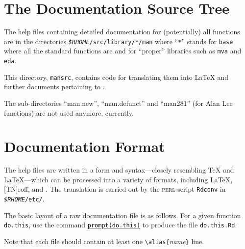 \newcommand*{\BS}{\textbackslash}
\newcommand*{\RHOMEdir}[1]{\texttt{\emph{\$RHOME}/#1}}
\newcommand*{\QQUAD}{\hspace*{1em}}

\section{The Documentation Source Tree}

The help files containing detailed documentation for (potentially) all
\R{} functions are in the directories \RHOMEdir{src/library/*/man} where
``\texttt{*}'' stands for \texttt{base} where all the standard functions
are and for ``proper'' libraries such as \texttt{mva} and \texttt{eda}.

This directory, \texttt{mansrc}, contains code for translating them into
\LaTeX{} and further documents pertaining to \R.

The sub-directories ``man.new'', ``man.defunct'' and ``man281'' (for
Alan Lee functions) are not used anymore, currently.


\section{Documentation Format}\label{sec:doc-format}

The help files are written in a form and syntax---closely resembling
\TeX{} and \LaTeX{}---which can be processed into a variety of formats,
including \LaTeX{}, [TN]roff, and \HTML{}.  The translation is carried
out by the \textsc{perl} script \texttt{Rdconv} in \RHOMEdir{etc/}.

The basic layout of a raw documentation file is as follows.  For a given
function \texttt{do.this}, use the \R{} command
\underline{\texttt{prompt(do.this)}} to produce the file
\texttt{do.this.Rd}.

Note that each file should contain at least one
\verb|\alias{|\emph{name}\texttt{\}} line.  

